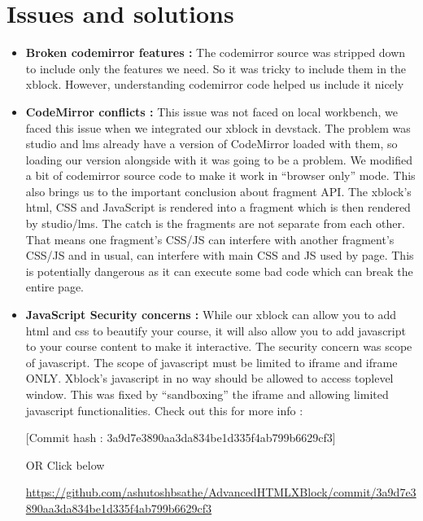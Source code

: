 \section{Issues and solutions}
\begin{itemize}
	\item \textbf{Broken codemirror features :}\newline
The codemirror source was stripped down to include only the features we need. So it was
tricky to include them in the xblock. However, understanding codemirror code helped us
include it nicely
	\item \textbf{CodeMirror conflicts :}\newline
This issue was not faced on local workbench, we faced this issue when we integrated our
xblock in devstack. The problem was studio and lms already have a version of CodeMirror
loaded with them, so loading our version alongside with it was going to be a problem. We
modified a bit of codemirror source code to make it work in “browser only” mode.
This also brings us to the important conclusion about fragment API. The xblock’s html, CSS
and JavaScript is rendered into a fragment which is then rendered by studio/lms. The catch
is the fragments are not separate from each other. That means one fragment’s CSS/JS can
interfere with another fragment’s CSS/JS and in usual, can interfere with main CSS and JS
used by page. This is potentially dangerous as it can execute some bad code which can break
the entire page.
	\item \textbf{JavaScript Security concerns :}\newline
While our xblock can allow you to add html and css to beautify your course, it will also
allow you to add javascript to your course content to make it interactive. The security
concern was scope of javascript. The scope of javascript must be limited to iframe and
iframe ONLY. Xblock’s javascript in no way should be allowed to access toplevel window.
This was fixed by “sandboxing” the iframe and allowing limited javascript functionalities.
Check out this for more info :\newline
\begin{center}[Commit hash : 3a9d7e3890aa3da834be1d335f4ab799b6629cf3]\end{center}
\begin{center} OR Click below \end{center}
\begin{center}
\begin{tiny}\url{https://github.com/ashutoshbsathe/AdvancedHTMLXBlock/commit/3a9d7e3890aa3da834be1d335f4ab799b6629cf3}\end{tiny}
\end{center}
\end{itemize}